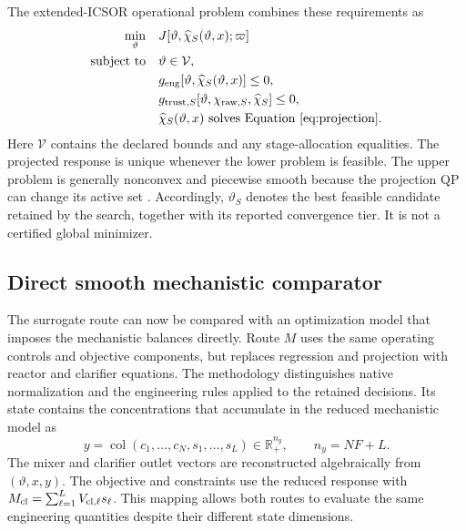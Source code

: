 \documentclass[a4paper,fleqn]{cas-sc}
\newcommand{\R}{\mathbb{R}}
\newcommand{\col}{\operatorname{col}}
\begin{document}
The extended-ICSOR operational problem combines these requirements as
\begin{equation}
\begin{aligned}
\min_{\vartheta}\quad&J[\vartheta,\widehat\chi_S(\vartheta,x);\varpi]\\
\text{subject to}\quad&\vartheta\in\mathcal V,\\
&g_{\rm eng}[\vartheta,\widehat\chi_S(\vartheta,x)]\le0,\\
&g_{{\rm trust},S}[\vartheta,\chi_{{\rm raw},S},\widehat\chi_S]\le0,\\
&\widehat\chi_S(\vartheta,x)\text{ solves Equation~\eqref{eq:projection}}.
\end{aligned}
\label{eq:bilevel}
\end{equation}
Here $\mathcal V$ contains the declared bounds and any stage-allocation equalities. The projected response is unique whenever the lower problem is feasible. The upper problem is generally nonconvex and piecewise smooth because the projection QP can change its active set \citep{Tondel2003,Colson2007}. Accordingly, $\vartheta_S$ denotes the best feasible candidate retained by the search, together with its reported convergence tier. It is not a certified global minimizer.

\subsection{Direct smooth mechanistic comparator}

The surrogate route can now be compared with an optimization model that imposes the mechanistic balances directly. Route $M$ uses the same operating controls and objective components, but replaces regression and projection with reactor and clarifier equations. The methodology distinguishes native normalization and the engineering rules applied to the retained decisions. Its state contains the concentrations that accumulate in the reduced mechanistic model as
\begin{equation}
y=\col(c_1,\ldots,c_N,s_1,\ldots,s_L)\in\R_+^{n_y},
\qquad n_y=NF+L.
\label{eq:directstate}
\end{equation}
The mixer and clarifier outlet vectors are reconstructed algebraically from $(\vartheta,x,y)$. The objective and constraints use the reduced response with $M_{\rm cl}=\sum_{\ell=1}^L V_{{\rm cl},\ell}s_\ell$. This mapping allows both routes to evaluate the same engineering quantities despite their different state dimensions.
\end{document}
